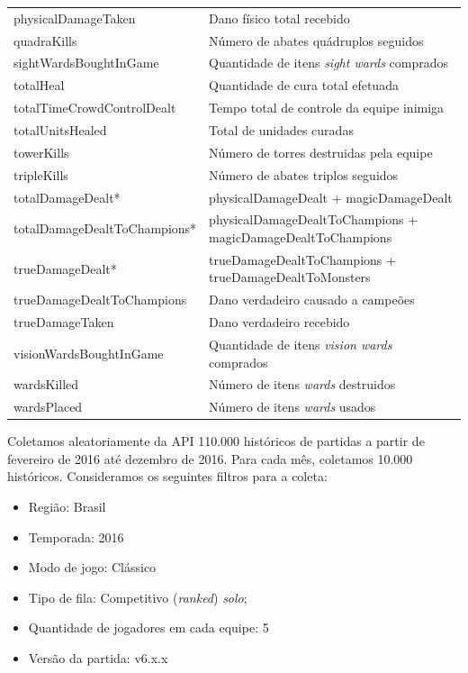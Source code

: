\begin{table}
\begin{tabular}{p{}p{}}
physicalDamageTaken & Dano físico total recebido\\
quadraKills & Número de abates quádruplos seguidos\\
sightWardsBoughtInGame & Quantidade de itens \textit{sight wards} comprados\\
totalHeal & Quantidade de cura total efetuada\\
totalTimeCrowdControlDealt & Tempo total de controle da equipe inimiga\\
totalUnitsHealed & Total de unidades curadas\\
towerKills & Número de torres destruidas pela equipe\\
tripleKills & Número de abates triplos seguidos\\
totalDamageDealt* & physicalDamageDealt + magicDamageDealt \\
totalDamageDealtToChampions* & physicalDamageDealtToChampions + magicDamageDealtToChampions \\
 trueDamageDealt* & trueDamageDealtToChampions + trueDamageDealtToMonsters\\
trueDamageDealtToChampions & Dano verdadeiro causado a campeões\\
trueDamageTaken & Dano verdadeiro recebido\\
visionWardsBoughtInGame & Quantidade de itens \textit{vision wards} comprados\\
wardsKilled & Número de itens \textit{wards} destruidos\\
wardsPlaced & Número de itens \textit{wards} usados\\
  \bottomrule
\end{tabular}
\end{table}

Coletamos aleatoriamente da API 110.000 históricos de partidas a partir de fevereiro de 2016 até dezembro de 2016. Para cada mês, coletamos 10.000 históricos. Consideramos os seguintes filtros para a coleta: 

\begin{itemize}
  \item Região: Brasil
  \item Temporada: 2016
  \item Modo de jogo: Clássico
  \item Tipo de fila: Competitivo (\textit{ranked}) \textit{solo};
  \item Quantidade de jogadores em cada equipe: 5
  \item Versão da partida: v6.x.x
\end{itemize}

